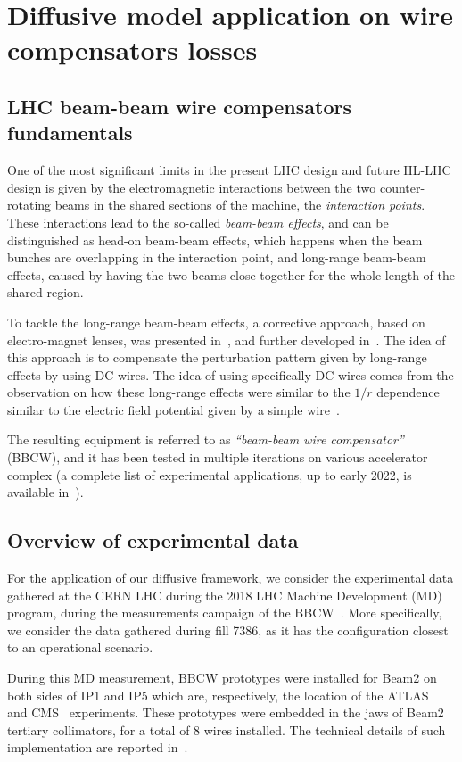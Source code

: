 \chapter{Diffusive model application on wire compensators losses}

\section{LHC beam-beam wire compensators fundamentals}

One of the most significant limits in the present LHC design and future HL-LHC design is given by the electromagnetic interactions between the two counter-rotating beams in the shared sections of the machine, the \textit{interaction points}. These interactions lead to the so-called \textit{beam-beam effects}, and can be distinguished as head-on beam-beam effects, which happens when the beam bunches are overlapping in the interaction point, and long-range beam-beam effects, caused by having the two beams close together for the whole length of the shared region.

To tackle the long-range beam-beam effects, a corrective approach, based on electro-magnet lenses, was presented in~\cite{}, and further developed in~\cite{}. The idea of this approach is to compensate the perturbation pattern given by long-range effects by using DC wires. The idea of using specifically DC wires comes from the observation on how these long-range effects were similar to the $1/r$ dependence similar to the electric field potential given by a simple wire~\cite{}.

The resulting equipment is referred to as \textit{``beam-beam wire compensator''} (BBCW), and it has been tested in multiple iterations on various accelerator complex (a complete list of experimental applications, up to early 2022, is available in~\cite{}).

\section{Overview of experimental data}

For the application of our diffusive framework, we consider the experimental data gathered at the CERN LHC during the 2018 LHC Machine Development (MD) program, during the measurements campaign of the BBCW~\cite{}. More specifically, we consider the data gathered during fill 7386, as it has the configuration closest to an operational scenario.

During this MD measurement, BBCW prototypes were installed for Beam2 on both sides of IP1 and IP5 which are, respectively, the location of the ATLAS~\cite{} and CMS~\cite{} experiments. These prototypes were embedded in the jaws of Beam2 tertiary collimators, for a total of 8 wires installed. The technical details of such implementation are reported in~\cite{}.

